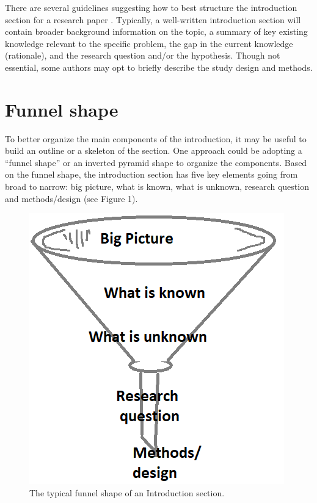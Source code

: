 \documentclass[
]{book}
\begin{document}
There are several guidelines suggesting how to best structure the introduction section for a research paper \citep[p.84-88]{cals2013effective, bahadoran2018principles, heard2016scientist}. Typically, a well-written introduction section will contain broader background information on the topic, a summary of key existing knowledge relevant to the specific problem, the gap in the current knowledge (rationale), and the research question and/or the hypothesis. Though not essential, some authors may opt to briefly describe the study design and methods.

\hypertarget{funnel-shape}{%
\section{Funnel shape}\label{funnel-shape}}

To better organize the main components of the introduction, it may be useful to build an outline or a skeleton of the section. One approach could be adopting a ``funnel shape'' or an inverted pyramid shape to organize the components. Based on the funnel shape, the introduction section has five key elements going from broad to narrow: big picture, what is known, what is unknown, research question and methods/design (see Figure 1).

\begin{figure}

{\centering \includegraphics[width=0.25\linewidth]{images/funnel} 

}

\caption{The typical funnel shape of an Introduction section.}\label{fig:funnel}
\end{figure}
\end{document}
